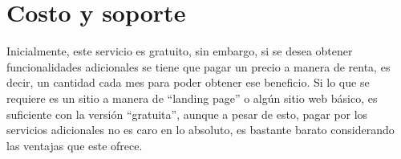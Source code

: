 \documentclass{article}
\begin{document}
\section{Costo y soporte}
Inicialmente, este servicio es gratuito, sin embargo, si se desea
obtener funcionalidades adicionales se tiene que pagar un precio
 a manera de renta, es decir, un cantidad cada mes para poder obtener
 ese beneficio.
 Si lo que se requiere es un sitio a manera de ``landing page'' o
 algún sitio web básico, es suficiente con la versión ``gratuita'', aunque
 a pesar de esto, pagar por los servicios adicionales no es caro en lo
 absoluto, es bastante barato considerando las ventajas que este ofrece.
\end{document}
